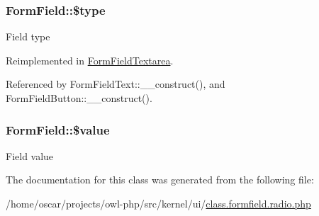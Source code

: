 \subsubsection[{\$type}]{\setlength{\rightskip}{0pt plus 5cm}FormField::\$type}\label{classFormField_a37bed21a1891e95be0e4a697e45ba51b}
Field type 

Reimplemented in \hyperlink{classFormFieldTextarea_a85348034822c70694fc8640bfcacc04d}{FormFieldTextarea}.



Referenced by FormFieldText::\_\-\_\-construct(), and FormFieldButton::\_\-\_\-construct().

\subsubsection[{\$value}]{\setlength{\rightskip}{0pt plus 5cm}FormField::\$value}\label{classFormField_a3c01e89834248eec8e2f145fbcfa0fbc}
Field value 

The documentation for this class was generated from the following file:\begin{DoxyCompactItemize}
\item 
/home/oscar/projects/owl-\/php/src/kernel/ui/\hyperlink{class_8formfield_8radio_8php}{class.formfield.radio.php}\end{DoxyCompactItemize}
